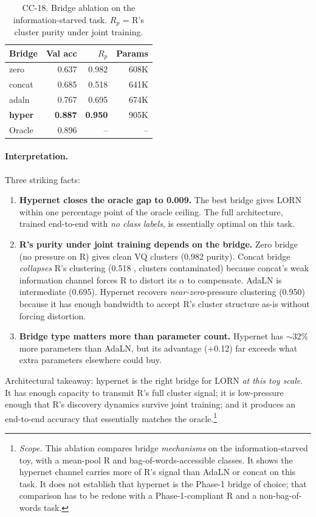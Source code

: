 \documentclass[10pt, twocolumn, a4paper]{article}
\begin{document}
\begin{table}[t]
\centering\small
\caption{CC-18. Bridge ablation on the information-starved task. $R_p$ = R's cluster purity under joint training.}
\label{tab:cc18}
\begin{tabular}{lrrr}
\toprule
Bridge & Val acc & $R_p$ & Params \\
\midrule
zero    & 0.637 & 0.982 & 608K \\
concat  & 0.685 & 0.518 & 641K \\
adaln   & 0.767 & 0.695 & 674K \\
\textbf{hyper}   & \textbf{0.887} & \textbf{0.950} & 905K \\
\midrule
Oracle  & 0.896 & -- & -- \\
\bottomrule
\end{tabular}
\end{table}

\paragraph{Interpretation.} Three striking facts:

\begin{enumerate}[nosep,leftmargin=*]
\item \textbf{Hypernet closes the oracle gap to 0.009.} The best bridge gives LORN within one percentage point of the oracle ceiling. The full architecture, trained end-to-end with \emph{no class labels}, is essentially optimal on this task.
\item \textbf{R's purity under joint training depends on the bridge.} Zero bridge (no pressure on R) gives clean VQ clusters (0.982 purity). Concat bridge \emph{collapses} R's clustering (0.518 ,  clusters contaminated) because concat's weak information channel forces R to distort its $\alpha$ to compensate. AdaLN is intermediate (0.695). Hypernet recovers \emph{near-zero}-pressure clustering (0.950) because it has enough bandwidth to accept R's cluster structure as-is without forcing distortion.
\item \textbf{Bridge type matters more than parameter count.} Hypernet has $\sim$32\% more parameters than AdaLN, but its advantage (+0.12) far exceeds what extra parameters elsewhere could buy.
\end{enumerate}

Architectural takeaway: hypernet is the right bridge for LORN \emph{at this toy scale}. It has enough capacity to transmit R's full cluster signal; it is low-pressure enough that R's discovery dynamics survive joint training; and it produces an end-to-end accuracy that essentially matches the oracle.\footnote{\emph{Scope.} This ablation compares bridge \emph{mechanisms} on the information-starved toy, with a mean-pool R and bag-of-words-accessible classes. It shows the hypernet channel carries more of R's signal than AdaLN or concat on this task. It does not establish that hypernet is the Phase-1 bridge of choice; that comparison has to be redone with a Phase-1-compliant R and a non-bag-of-words task.}
\end{document}
